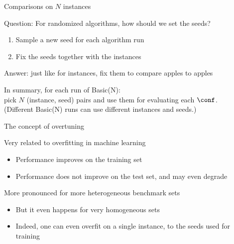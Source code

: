 \begin{frame}[c]{Comparisons on $N$ instances}

Question: For randomized algorithms, how should we set the seeds? \hands
\begin{enumerate}
\item Sample a new seed for each algorithm run
\item Fix the seeds together with the instances
\end{enumerate}
\bigskip
\pause
Answer: just like for instances, fix them to compare apples to apples

\bigskip
\pause
In summary, for each run of Basic(N): \\pick $N$ (instance, seed) pairs and use them for evaluating each $\conf$.\\
\pause
(Different Basic(N) runs can use different instances and seeds.)

\end{frame}


\begin{frame}[c]{The concept of overtuning}

Very related to overfitting in machine learning 
\begin{itemize}
\item Performance improves on the training set
\item Performance does not improve on the test set, and may even degrade
\end{itemize}	

\pause
\medskip

More pronounced for more heterogeneous benchmark sets 
\begin{itemize}
\item But it even happens for very homogeneous sets
\item Indeed, one can even overfit on a single instance, to the \alert{seeds} used for training 
\end{itemize}	

\end{frame}

